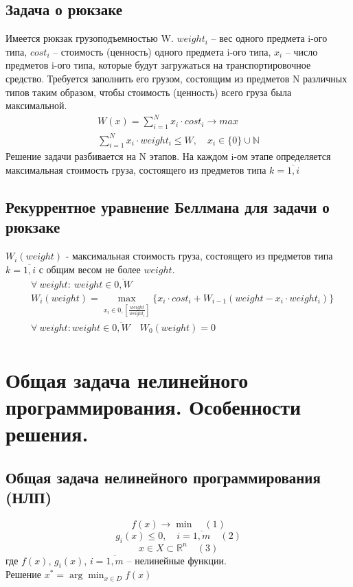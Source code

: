 \documentclass[17pt]{extarticle}
\begin{document}
\subsection*{Задача о рюкзаке}
Имеется рюкзак грузоподъемностью W.
$weight_i$ – вес одного предмета i-ого типа,
$cost_i$ – стоимость (ценность) одного предмета i-ого типа,
$x_i$ – число предметов i-ого типа, которые будут загружаться на транспортировочное средство.
Требуется заполнить его грузом, состоящим из предметов N различных типов таким образом, чтобы стоимость (ценность) всего груза была максимальной.
\[
    \begin{aligned}
        W(x)=\sum_{i=1}^{N} x_i \cdot cost_i \rightarrow max \\
        \sum_{i=1}^{N} x_i \cdot weight_i \leq W, \quad x_i \in \{0\} \cup \mathbb{N}
    \end{aligned}
\]
Решение задачи разбивается на N этапов. На каждом i-ом этапе определяется максимальная стоимость груза,
состоящего из предметов типа $k=\overline{1,i}$
\subsection*{Рекуррентное уравнение Беллмана для задачи о рюкзаке}
$W_i(weight)$ - максимальная стоимость груза, состоящего из предметов типа $k=\overline{1,i}$ с общим весом не более $weight$.
\[
    \begin{aligned}
         & \forall \ weight \colon \ weight \in \overline{0,W}                                                                                         \\
         & W_i(weight) = \max_{x_i \in \overline{0, \left[\frac{weight}{weight_i}\right]}} \{x_i \cdot cost_i + W_{i-1}(weight - x_i \cdot weight_i)\} \\
         & \forall \ weight \colon weight \in \overline{0,W} \quad  W_0(weight)=0                                                                      \\
    \end{aligned}
\]


\section{Общая задача нелинейного \\ программирования. Особенности решения.}
\subsection{Общая задача нелинейного программирования (НЛП)}
\[
    f(x) \rightarrow \min \quad (1)
\]
\[
    g_i(x) \leq 0, \quad i = \overline{1, m} \quad (2)
\]
\[
    x \in X \subset \mathbb{R}^n \quad (3)
\]
где \( f(x) \), \( g_i(x) \), \( i = \overline{1, m} \) -- нелинейные функции. \\
Решение \(x^* = \arg \min_{x \in D} f(x)\)
\end{document}
